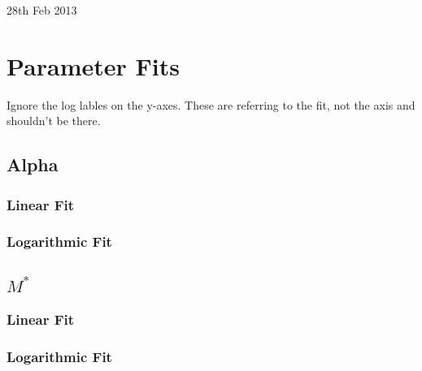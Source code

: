 \documentclass{article}
\begin{document}
\small{28th Feb 2013}
\section{Parameter Fits}
	Ignore the log lables on the y-axes. These are referring to the fit, not the axis and shouldn't be there.
	\subsection{Alpha}
		\subsubsection{Linear Fit}
		\begin{figure}[ht]
			\begin{center}
				
			\end{center}
		\end{figure}

		\subsubsection{Logarithmic Fit}
		\begin{figure}[ht]
			\begin{center}
				
			\end{center}
		\end{figure}
		\newpage

	\subsection{$M^{*}$}
		\subsubsection{Linear Fit}
		\begin{figure}[ht]
			\begin{center}
				
			\end{center}
		\end{figure}

		\subsubsection{Logarithmic Fit}
		\begin{figure}[ht]
			\begin{center}
				
			\end{center}
		\end{figure}
		\newpage
\end{document}
